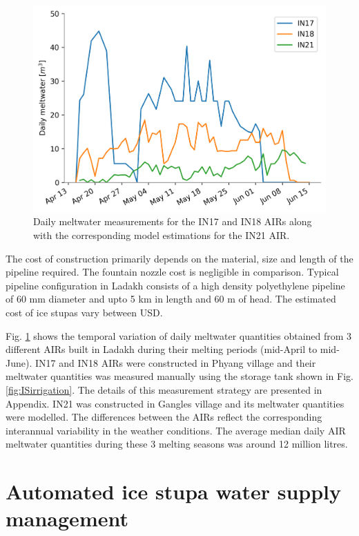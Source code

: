 \begin{figure}[htb]
\centering
\includegraphics[width=12cm]{figs/melt.png}

\caption{Daily meltwater measurements for the IN17 and IN18 AIRs along with the corresponding model estimations
for the IN21 AIR. }

\label{fig:ISmelt}
\end{figure}

The cost of construction primarily depends on the material, size and length of the pipeline required. The
fountain nozzle cost is negligible in comparison. Typical pipeline configuration in Ladakh consists of a high
density polyethylene pipeline of 60 mm diameter and upto 5 km in length and 60 m of head. The estimated cost
of ice stupas vary between USD.

Fig. \ref{fig:ISmelt} shows the temporal variation of daily meltwater quantities obtained from 3 different AIRs
built in Ladakh during their melting periods (mid-April to mid-June). IN17 and IN18 AIRs were constructed in
Phyang village and their meltwater quantities was measured manually using the storage tank shown in Fig.
\ref{fig:ISirrigation}. The details of this measurement strategy are presented in Appendix. IN21 was constructed
in Gangles village and its meltwater quantities were modelled. The differences between the AIRs reflect the
corresponding interannual variability in the weather conditions. The average median daily AIR meltwater
quantities during these 3 melting seasons was around 12 million litres.   

\section{Automated ice stupa water supply management}

